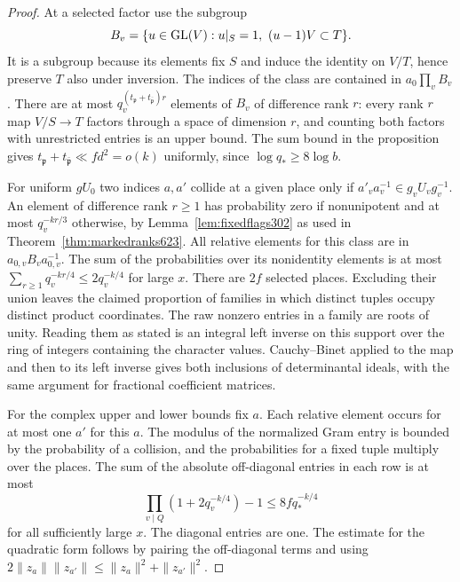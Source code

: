 \documentclass[a4paper,11pt]{article}
\theoremstyle{definition}
\theoremstyle{remark}
\numberwithin{equation}{section}
\begin{document}
\begin{proof}
At a selected factor use the subgroup
\[
 B_v=\{u\in{\rm GL}(V):u|_S=1,\ (u-1)V\subset T\}.
\]
It is a subgroup because its elements fix \(S\) and induce the
identity on \(V/T\), hence preserve \(T\) also under inversion.
The indices of the class are contained in \(a_0\prod_v B_v\).
There are at most \(q_v^{(t_{\mathfrak p}+t_{\bar{\mathfrak p}})r}\)
elements of \(B_v\) of difference rank \(r\): every rank \(r\)
map \(V/S\to T\) factors through a space of dimension \(r\), and
counting both factors with unrestricted entries is an upper bound.
The sum bound in the proposition gives
\(t_{\mathfrak p}+t_{\bar{\mathfrak p}}\ll fd^2=o(k)\) uniformly,
since \(\log q_*\ge8\log b\).

For uniform \(gU_0\) two indices \(a,a'\) collide at a given place
only if \(a'_va_v^{-1}\in g_v U_v g_v^{-1}\).
An element of difference rank \(r\ge1\) has probability zero if
nonunipotent and at most \(q_v^{-kr/3}\) otherwise, by
Lemma~\ref{lem:fixedflags302} as used in
Theorem~\ref{thm:markedranks623}. All relative elements for this
class are in \(a_{0,v}B_va_{0,v}^{-1}\). The sum of the probabilities
over its nonidentity elements is at most
\(\sum_{r\ge1}q_v^{-kr/4}\le2q_v^{-k/4}\) for large \(x\).
There are \(2f\) selected places. Excluding their union leaves the
claimed proportion of families in which distinct tuples occupy
distinct product coordinates. The raw nonzero entries in a family are roots of
unity. Reading them as stated is an integral left inverse on this
support over the ring of integers containing the character values.
Cauchy--Binet applied to the map and then to its left inverse gives
both inclusions of determinantal ideals, with the same argument
for fractional coefficient matrices.

For the complex upper and lower bounds fix \(a\). Each relative
element occurs for at most one \(a'\) for this \(a\). The modulus
of the normalized Gram entry is bounded by the probability of a
collision, and the probabilities for a fixed tuple multiply over
the places. The sum of the absolute off-diagonal entries in each
row is at most
\[
           \prod_{v\mid Q}(1+2q_v^{-k/4})-1
                 \le 8f q_*^{-k/4}
\]
for all sufficiently large \(x\). The diagonal entries are one.
The estimate for the quadratic form follows by pairing the
off-diagonal terms and using
\(2\|z_a\|\|z_{a'}\|\le\|z_a\|^2+\|z_{a'}\|^2\).
\end{proof}
\end{document}
